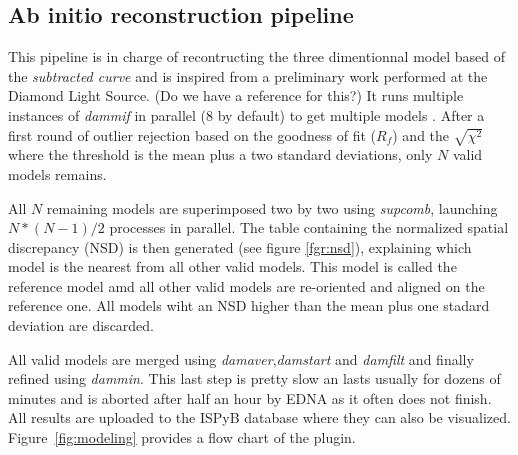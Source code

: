 \documentclass[preprint,pdf]{iucr}              %
\begin{document}
\subsection{Ab initio reconstruction pipeline}

This pipeline is in charge of recontructing the three dimentionnal model based
of the \textit{subtracted curve} and is inspired from a preliminary work
performed at the Diamond Light Source. (Do we have a reference for this?)
It runs multiple instances of \textit{dammif} in parallel (8 by default) to get
multiple models \cite{dammif}.
After a first round of outlier rejection based on the goodness of fit ($R_{f}$) and the
$\sqrt{\chi^{2}}$  where the threshold is the mean plus a two standard
deviations, only $N$ valid models remains.



All $N$ remaining models are superimposed two by two using
\textit{supcomb}\cite{supcomb}, launching $N*(N-1)/2$ processes in parallel.
The table containing the normalized spatial discrepancy (NSD) is then generated
(see figure \ref{fgr:nsd}), explaining which model is the nearest from all other
valid models. This model is called the reference model amd all other valid
models are re-oriented and aligned on the reference one. All models wiht an NSD higher than the mean plus one stadard deviation are discarded.


All valid models are merged using \textit{damaver}\cite{damaver},\textit{damstart} and
\textit{damfilt} and finally refined using \textit{dammin}\cite{dammin}.
This last step is pretty slow an lasts usually for dozens of minutes and is
aborted after half an hour by EDNA as it often does not finish. All results are
uploaded to the ISPyB database where they can also be visualized. Figure~\ref{fig:modeling} provides a flow chart of the plugin.
\end{document}
